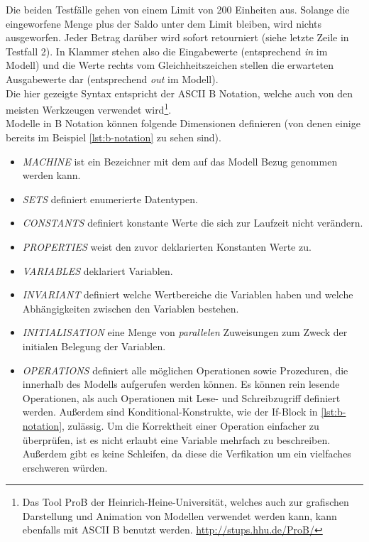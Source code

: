 Die beiden Testfälle gehen von einem Limit von 200 Einheiten aus. Solange die eingeworfene Menge plus der Saldo unter dem Limit bleiben, wird nichts ausgeworfen. Jeder Betrag darüber wird sofort retourniert (siehe letzte Zeile in Testfall 2). In Klammer stehen also die Eingabewerte (entsprechend \textit{in} im Modell) und die Werte rechts vom Gleichheitszeichen stellen die erwarteten Ausgabewerte dar (entsprechend \textit{out} im Modell).\\
Die hier gezeigte Syntax entspricht der ASCII B Notation, welche auch von den meisten Werkzeugen verwendet wird\footnote{Das Tool ProB der Heinrich-Heine-Universität, welches auch zur grafischen Darstellung und Animation von Modellen verwendet werden kann, kann ebenfalls mit ASCII B benutzt werden. \url{http://stups.hhu.de/ProB/}}.\\

Modelle in B Notation können folgende Dimensionen definieren (von denen einige bereits im Beispiel \ref{lst:b-notation} zu sehen sind).

\begin{itemize}
\item \textit{MACHINE} ist ein Bezeichner mit dem auf das Modell Bezug genommen werden kann.
\item \textit{SETS} definiert enumerierte Datentypen.
\item \textit{CONSTANTS} definiert konstante Werte die sich zur Laufzeit nicht verändern.
\item \textit{PROPERTIES} weist den zuvor deklarierten Konstanten Werte zu.
\item \textit{VARIABLES} deklariert Variablen.
\item \textit{INVARIANT} definiert welche Wertbereiche die Variablen haben und welche Abhängigkeiten zwischen den Variablen bestehen.
\item \textit{INITIALISATION} eine Menge von \textit{parallelen} Zuweisungen zum Zweck der initialen Belegung der Variablen.
\item \textit{OPERATIONS} definiert alle möglichen Operationen sowie Prozeduren, die innerhalb des Modells aufgerufen werden können. Es können rein lesende Operationen, als auch Operationen mit Lese- und Schreibzugriff definiert werden. Außerdem sind Konditional-Konstrukte, wie der If-Block in \ref{lst:b-notation}, zulässig. Um die Korrektheit einer Operation einfacher zu überprüfen, ist es nicht erlaubt eine Variable mehrfach zu beschreiben. Außerdem gibt es keine Schleifen, da diese die Verfikation um ein vielfaches erschweren würden.
\end{itemize}


